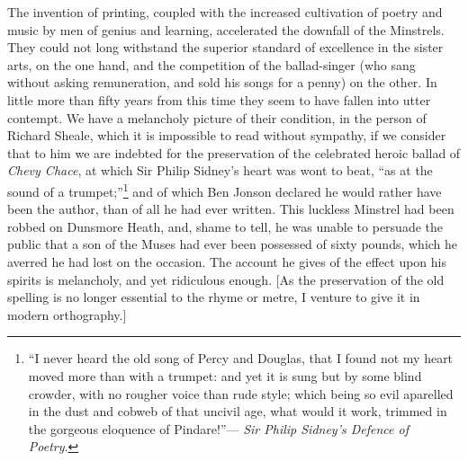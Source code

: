 The invention of printing, coupled with the increased cultivation of poetry and
music by men of genius and learning, accelerated the downfall of the Minstrels.
They could not long withstand the superior standard of excellence in the sister
arts, on the one hand, and the competition of the ballad-singer (who sang without
asking remuneration, and sold his songs for a penny) on the other. In little more
than fifty years from this time they seem to have fallen into utter contempt. We
have a melancholy picture of their condition, in the person of Richard Sheale,
which it is impossible to read without sympathy, if we consider that to him we
are indebted for the preservation of the celebrated heroic ballad of \textit{Chevy Chace},
at which Sir Philip Sidney’s heart was \pagebreak
 wont to beat, “as at the sound of a
trumpet;”\footnote{
“I never heard the old song of Percy and Douglas, that
I found not my heart moved more than with a trumpet: and
yet it is sung but by some blind crowder, with no rougher
voice than rude style; which being so evil aparelled
in the dust and cobweb of that uncivil age, what would it
work, trimmed in the gorgeous eloquence of Pindare!”—
\textit{Sir Philip Sidney’s Defence of Poetry}.
} and of which Ben Jonson declared he would rather have been the
author, than of all he had ever written. This luckless Minstrel had been robbed
on Dunsmore Heath, and, shame to tell, he was unable to persuade the public
that a son of the Muses had ever been possessed of sixty pounds, which he
averred he had lost on the occasion. The account he gives of the effect upon his
spirits is melancholy, and yet ridiculous enough. [As the preservation of the
old spelling is no longer essential to the rhyme or metre, I venture to give it in
modern orthography.]

